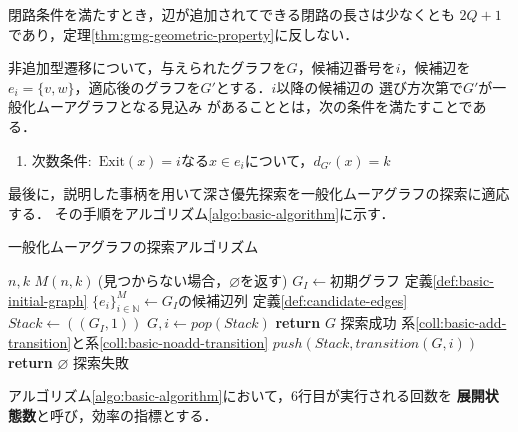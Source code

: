 閉路条件を満たすとき，辺が追加されてできる閉路の長さは少なくとも
$2Q+1$であり，定理\ref{thm:gmg-geometric-property}に反しない．

\begin{corollary-without-proof}\rm
  \label{coll:basic-noadd-transition}
  非追加型遷移について，与えられたグラフを$G$，候補辺番号を$i$，候補辺を
  $e_i=\{v,w\}$，適応後のグラフを$G'$とする．$i$以降の候補辺の
  選び方次第で$G'$が一般化ムーアグラフとなる見込み
  があることとは，次の条件を満たすことである．
  \begin{enumerate}
  \item 次数条件:\ $\text{Exit}(x)=i$なる$x\in e_i$について，$d_{G'}(x)=k$
  \end{enumerate}
\end{corollary-without-proof}

最後に，説明した事柄を用いて深さ優先探索を一般化ムーアグラフの探索に適応する．
その手順をアルゴリズム\ref{algo:basic-algorithm}に示す．
\begin{algorithm}[H]
  \caption{一般化ムーアグラフの探索アルゴリズム}
  \label{algo:basic-algorithm}
  \begin{algorithmic}[1]
    \Require $n,k$
    \Ensure $M(n,k)\:$(見つからない場合，$\varnothing$を返す)
    \State $G_I\gets\text{初期グラフ}$
    \Comment 定義\ref{def:basic-initial-graph}
    \State $\{e_i\}_{i\in\mathbb{N}}^M\gets G_I\text{の候補辺列}$
    \Comment 定義\ref{def:candidate-edges}
    \State $Stack\gets((G_I,1))$
    \State $G,i\gets pop(Stack)$
    \State \textbf{return} $G$
    \Comment 探索成功
    \EndIf
    \Comment 系\ref{coll:basic-add-transition}と系\ref{coll:basic-noadd-transition}
    \State $push(Stack,transition(G,i))$
    \EndIf
    \EndFor
    \EndWhile
    \State \textbf{return} $\varnothing$
    \Comment 探索失敗
    \EndProcedure
  \end{algorithmic}
\end{algorithm}
アルゴリズム\ref{algo:basic-algorithm}において，6行目が実行される回数を
\textbf{展開状態数}と呼び，効率の指標とする．

